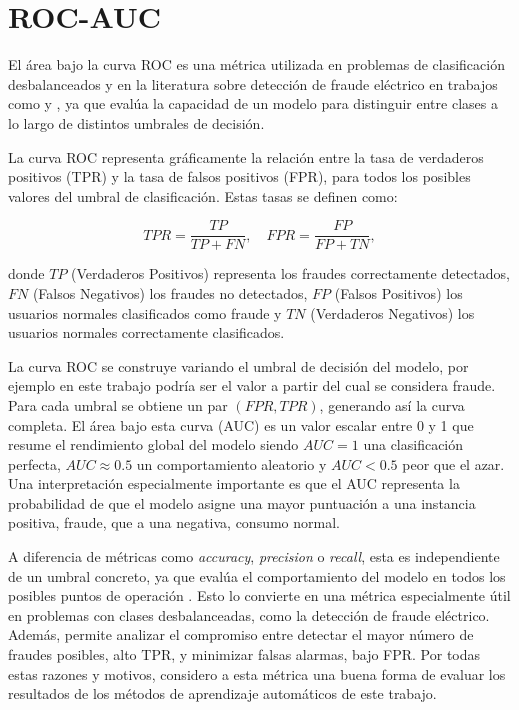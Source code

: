 \documentclass[12pt,a4paper]{report}
\begin{document}
\section{ROC-AUC}

El área bajo la curva ROC es una métrica utilizada en problemas de clasificación desbalanceados y en la literatura sobre detección de fraude eléctrico en trabajos como \cite{articuloBase} y \cite{articulo3}, ya que evalúa la capacidad de un modelo para distinguir entre clases a lo largo de distintos umbrales de decisión.

La curva ROC representa gráficamente la relación entre la tasa de verdaderos positivos (TPR) y la tasa de falsos positivos (FPR), para todos los posibles valores del umbral de clasificación. Estas tasas se definen como:

\[
TPR = \frac{TP}{TP + FN}, \quad FPR = \frac{FP}{FP + TN}
,\]

\noindent donde $TP$ (Verdaderos Positivos) representa los fraudes correctamente detectados, $FN$ (Falsos Negativos) los fraudes no detectados, $FP$ (Falsos Positivos) los usuarios normales clasificados como fraude y $TN$ (Verdaderos Negativos) los usuarios normales correctamente clasificados.

La curva ROC se construye variando el umbral de decisión del modelo, por ejemplo en este trabajo podría ser el valor a partir del cual se considera fraude. Para cada umbral se obtiene un par $(FPR, TPR)$, generando así la curva completa. El área bajo esta curva (AUC) es un valor escalar entre 0 y 1 que resume el rendimiento global del modelo siendo $AUC = 1$ una clasificación perfecta, $AUC \approx 0.5$ un comportamiento aleatorio y $AUC < 0.5$ peor que el azar. Una interpretación especialmente importante es que el AUC representa la probabilidad de que el modelo asigne una mayor puntuación a una instancia positiva, fraude, que a una negativa, consumo normal.

A diferencia de métricas como \emph{accuracy}, \emph{precision} o \emph{recall}, esta es independiente de un umbral concreto, ya que evalúa el comportamiento del modelo en todos los posibles puntos de operación . Esto lo convierte en una métrica especialmente útil en problemas con clases desbalanceadas, como la detección de fraude eléctrico. Además, permite analizar el compromiso entre detectar el mayor número de fraudes posibles, alto TPR, y minimizar falsas alarmas, bajo FPR. Por todas estas razones y motivos, considero a esta métrica una buena forma de evaluar los resultados de los métodos de aprendizaje automáticos de este trabajo.
\end{document}
